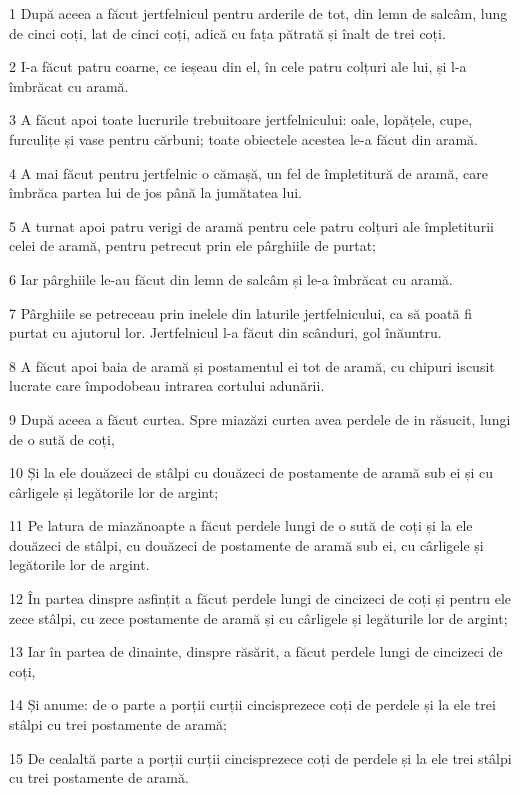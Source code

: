 \par 1 După aceea a făcut jertfelnicul pentru arderile de tot, din lemn de salcâm, lung de cinci coți, lat de cinci coți, adică cu fața pătrată și înalt de trei coți.
\par 2 I-a făcut patru coarne, ce ieșeau din el, în cele patru colțuri ale lui, și l-a îmbrăcat cu aramă.
\par 3 A făcut apoi toate lucrurile trebuitoare jertfelnicului: oale, lopățele, cupe, furculițe și vase pentru cărbuni; toate obiectele acestea le-a făcut din aramă.
\par 4 A mai făcut pentru jertfelnic o cămașă, un fel de împletitură de aramă, care îmbrăca partea lui de jos până la jumătatea lui.
\par 5 A turnat apoi patru verigi de aramă pentru cele patru colțuri ale împletiturii celei de aramă, pentru petrecut prin ele pârghiile de purtat;
\par 6 Iar pârghiile le-au făcut din lemn de salcâm și le-a îmbrăcat cu aramă.
\par 7 Pârghiile se petreceau prin inelele din laturile jertfelnicului, ca să poată fi purtat cu ajutorul lor. Jertfelnicul l-a făcut din scânduri, gol înăuntru.
\par 8 A făcut apoi baia de aramă și postamentul ei tot de aramă, cu chipuri iscusit lucrate care împodobeau intrarea cortului adunării.
\par 9 După aceea a făcut curtea. Spre miazăzi curtea avea perdele de in răsucit, lungi de o sută de coți,
\par 10 Și la ele douăzeci de stâlpi cu douăzeci de postamente de aramă sub ei și cu cârligele și legătorile lor de argint;
\par 11 Pe latura de miazănoapte a făcut perdele lungi de o sută de coți și la ele douăzeci de stâlpi, cu douăzeci de postamente de aramă sub ei, cu cârligele și legătorile lor de argint.
\par 12 În partea dinspre asfințit a făcut perdele lungi de cincizeci de coți și pentru ele zece stâlpi, cu zece postamente de aramă și cu cârligele și legăturile lor de argint;
\par 13 Iar în partea de dinainte, dinspre răsărit, a făcut perdele lungi de cincizeci de coți,
\par 14 Și anume: de o parte a porții curții cincisprezece coți de perdele și la ele trei stâlpi cu trei postamente de aramă;
\par 15 De cealaltă parte a porții curții cincisprezece coți de perdele și la ele trei stâlpi cu trei postamente de aramă.
